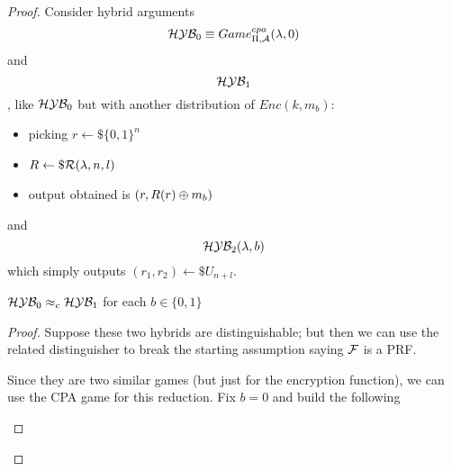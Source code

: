 \begin{proof}
    Consider hybrid arguments
    \[
        \mathcal{H}\mathcal{Y}\mathcal{B}_{0} \equiv Game_{\Pi, \mathcal{A}}^{cpa}(\lambda, 0)
    \]
    and 
    \[ \mathcal{H}\mathcal{Y}\mathcal{B}_{1}\], like $\mathcal{H}\mathcal{Y}\mathcal{B}_{0}$ but with another distribution of $Enc(k,
    m_{b})$: \begin{itemize}
        \item picking $r \leftarrow\$ \{0,1\}^{n} $
        \item $R \leftarrow\$ \mathcal{R}(\lambda, n, l)$
        \item output obtained is $(r, R(r) \oplus m_{b})$
    \end{itemize}
    and 
    \[ \mathcal{H}\mathcal{Y}\mathcal{B}_{2}(\lambda, b)\] which simply outputs $(r_{1}, r_{2})
    \leftarrow\$ U_{n+l}$.

\begin{lemma}
    $\mathcal{H}\mathcal{Y}\mathcal{B}_{0} \approx_{c} \mathcal{H}\mathcal{Y}\mathcal{B}_{1}$ for each $b \in
    \{0,1\} 
    $
\end{lemma}
\begin{proof}
    Suppose these two hybrids are distinguishable; but then we can use the related distinguisher to break the starting assumption saying $\mathcal{F}$ is a PRF.

    Since they are two similar games (but just for the encryption function), we can use
    the CPA game for this reduction.
\newpage
    Fix $b=0$ and build the following


\begin{figure}[h!]
   \centering
   \sdinit{}
\end{figure}
\end{proof}
\end{proof}
